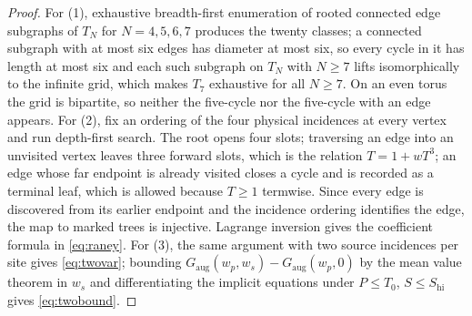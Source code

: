 \documentclass[11pt]{article}
\theoremstyle{plain}
\theoremstyle{definition}
\begin{document}
\begin{proof}
For (1), exhaustive breadth-first enumeration of rooted connected edge subgraphs of
$T_N$ for $N=4,5,6,7$ produces the twenty classes; a connected subgraph with at most
six edges has diameter at most six, so every cycle in it has length at most six and
each such subgraph on $T_N$ with $N\ge7$ lifts isomorphically to the infinite grid,
which makes $T_7$ exhaustive for all $N\ge7$. On an even torus the grid is bipartite,
so neither the five-cycle nor the five-cycle with an edge appears. For (2), fix an
ordering of the four physical incidences at every vertex and run depth-first search.
The root opens four slots; traversing an edge into an unvisited vertex leaves three
forward slots, which is the relation $T=1+wT^{3}$; an edge whose far endpoint is
already visited closes a cycle and is recorded as a terminal leaf, which is allowed
because $T\ge1$ termwise. Since every edge is discovered from its earlier endpoint
and the incidence ordering identifies the edge, the map to marked trees is injective.
Lagrange inversion gives the coefficient formula in \eqref{eq:raney}. For (3), the
same argument with two source incidences per site gives \eqref{eq:twovar}; bounding
$G_{\mathrm{aug}}(w_p,w_s)-G_{\mathrm{aug}}(w_p,0)$ by the mean value theorem in
$w_s$ and differentiating the implicit equations under $P\le T_0$, $S\le S_{\mathrm{hi}}$
gives \eqref{eq:twobound}.
\end{proof}
\end{document}
